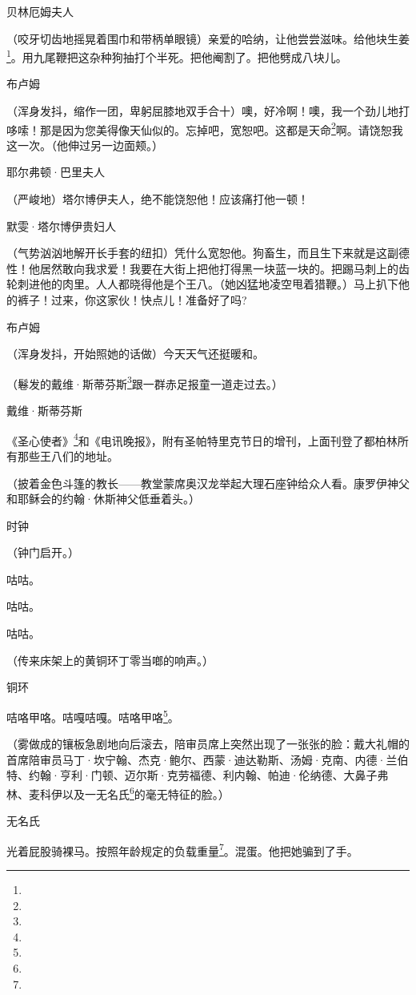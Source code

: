 \par 贝林厄姆夫人
\par （咬牙切齿地摇晃着围巾和带柄单眼镜）亲爱的哈纳，让他尝尝滋味。给他块生姜\footnote{}。用九尾鞭把这杂种狗抽打个半死。把他阉割了。把他劈成八块儿。
\par 布卢姆
\par （浑身发抖，缩作一团，卑躬屈膝地双手合十）噢，好冷啊！噢，我一个劲儿地打哆嗦！那是因为您美得像天仙似的。忘掉吧，宽恕吧。这都是天命\footnote{}啊。请饶恕我这一次。（他伸过另一边面颊。）
\par 耶尔弗顿·巴里夫人
\par （严峻地）塔尔博伊夫人，绝不能饶恕他！应该痛打他一顿！
\par 默雯·塔尔博伊贵妇人
\par （气势汹汹地解开长手套的纽扣）凭什么宽恕他。狗畜生，而且生下来就是这副德性！他居然敢向我求爱！我要在大街上把他打得黑一块蓝一块的。把踢马刺上的齿轮刺进他的肉里。人人都晓得他是个王八。（她凶猛地凌空甩着猎鞭。）马上扒下他的裤子！过来，你这家伙！快点儿！准备好了吗?
\par 布卢姆
\par （浑身发抖，开始照她的话做）今天天气还挺暖和。
\par （鬈发的戴维·斯蒂芬斯\footnote{}跟一群赤足报童一道走过去。）
\par 戴维·斯蒂芬斯
\par 《圣心使者》\footnote{}和《电讯晚报》，附有圣帕特里克节日的增刊，上面刊登了都柏林所有那些王八们的地址。
\par （披着金色斗篷的教长——教堂蒙席奥汉龙举起大理石座钟给众人看。康罗伊神父和耶稣会的约翰·休斯神父低垂着头。）
\par 时钟
\par （钟门启开。）
\par 咕咕。
\par 咕咕。
\par 咕咕。
\par （传来床架上的黄铜环丁零当啷的响声。）
\par 铜环
\par 咭咯甲咯。咭嘎咭嘎。咭咯甲咯\footnote{}。
\par （雾做成的镶板急剧地向后滚去，陪审员席上突然出现了一张张的脸：戴大礼帽的首席陪审员马丁·坎宁翰、杰克·鲍尔、西蒙·迪达勒斯、汤姆·克南、内德·兰伯特、约翰·亨利·门顿、迈尔斯·克劳福德、利内翰、帕迪·伦纳德、大鼻子弗林、麦科伊以及一无名氏\footnote{}的毫无特征的脸。）
\par 无名氏
\par 光着屁股骑裸马。按照年龄规定的负载重量\footnote{}。混蛋。他把她骗到了手。
